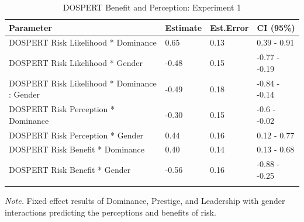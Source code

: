 \documentclass[
  donotrepeattitle,doc, 12pt, a4paper,floatsintext]{apa7}
\begin{document}
\begin{table}[ht]

\begin{center}
\begin{threeparttable}

\caption{\label{tab:m4-perceivedRisk-Gender-exp-1}DOSPERT Benefit and Perception: Experiment 1}

\small{

\begin{tabular}{llll}
\toprule
Parameter & \multicolumn{1}{c}{Estimate} & \multicolumn{1}{c}{Est.Error} & \multicolumn{1}{c}{CI (95\%)}\\
\midrule
DOSPERT Risk Likelihood * Dominance & 0.65 & 0.13 & 0.39 - 0.91\\
DOSPERT Risk Likelihood * Gender & -0.48 & 0.15 & -0.77 - -0.19\\
DOSPERT Risk Likelihood * Dominance : Gender & -0.49 & 0.18 & -0.84 - -0.14\\
DOSPERT Risk Perception * Dominance & -0.30 & 0.15 & -0.6 - -0.02\\
DOSPERT Risk Perception * Gender & 0.44 & 0.16 & 0.12 - 0.77\\
DOSPERT Risk Benefit * Dominance & 0.40 & 0.14 & 0.13 - 0.68\\
DOSPERT Risk Benefit * Gender & -0.56 & 0.16 & -0.88 - -0.25\\
\bottomrule
\addlinespace
\end{tabular}

}

\begin{tablenotes}[para]
\normalsize{\textit{Note.} Fixed effect results of Dominance, Prestige, and Leadership with gender interactions predicting the perceptions and benefits of risk.}
\end{tablenotes}

\end{threeparttable}
\end{center}

\end{table}
\end{document}
